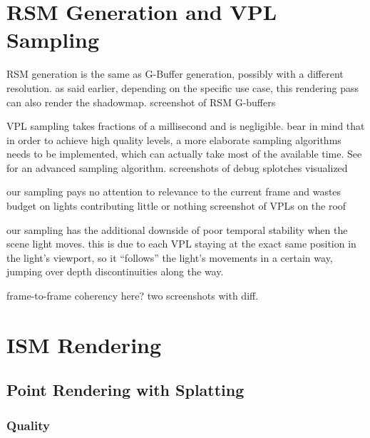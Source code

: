 \section{RSM Generation and VPL Sampling}
\begin{outline}
\1 RSM generation is the same as G-Buffer generation, possibly with a different resolution. as said earlier, depending on the specific use case, this rendering pass can also render the shadowmap.
\1 screenshot of RSM G-buffers

\1 VPL sampling takes fractions of a millisecond and is negligible. bear in mind that in order to achieve high quality levels, a more elaborate sampling algorithms needs to be implemented, which can actually take most of the available time. See \citep{hedman2016sequential} for an advanced sampling algorithm.
\1 screenshots of debug splotches visualized

\1 our sampling pays no attention to relevance to the current frame and wastes budget on lights contributing little or nothing
\1 screenshot of VPLs on the roof

\1 our sampling has the additional downside of poor temporal stability when the scene light moves. this is due to each VPL staying at the exact same position in the light's viewport, so it ``follows'' the light's movements in a certain way, jumping over depth discontinuities along the way.

\1 frame-to-frame coherency here? two screenshots with diff.
\end{outline}


\section{ISM Rendering}

\subsection{Point Rendering with Splatting}






\subsubsection{Quality}

